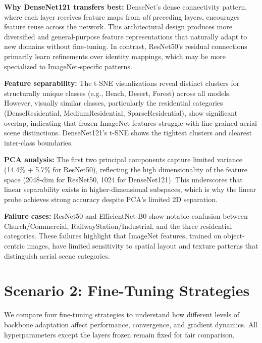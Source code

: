 \documentclass[11pt, a4paper]{article}
\begin{document}
\textbf{Why DenseNet121 transfers best:} DenseNet's dense connectivity pattern, where each layer receives feature maps from \emph{all} preceding layers, encourages feature reuse across the network. This architectural design produces more diversified and general-purpose feature representations that naturally adapt to new domains without fine-tuning. In contrast, ResNet50's residual connections primarily learn refinements over identity mappings, which may be more specialized to ImageNet-specific patterns.

\textbf{Feature separability:} The t-SNE visualizations reveal distinct clusters for structurally unique classes (e.g., Beach, Desert, Forest) across all models. However, visually similar classes, particularly the residential categories (DenseResidential, MediumResidential, SparseResidential), show significant overlap, indicating that frozen ImageNet features struggle with fine-grained aerial scene distinctions. DenseNet121's t-SNE shows the tightest clusters and clearest inter-class boundaries.

\textbf{PCA analysis:} The first two principal components capture limited variance (14.4\% + 5.7\% for ResNet50), reflecting the high dimensionality of the feature space (2048-dim for ResNet50, 1024 for DenseNet121). This underscores that linear separability exists in higher-dimensional subspaces, which is why the linear probe achieves strong accuracy despite PCA's limited 2D separation.

\textbf{Failure cases:} ResNet50 and EfficientNet-B0 show notable confusion between Church/Commercial, RailwayStation/Industrial, and the three residential categories. These failures highlight that ImageNet features, trained on object-centric images, have limited sensitivity to spatial layout and texture patterns that distinguish aerial scene categories.


\section{Scenario 2: Fine-Tuning Strategies}

We compare four fine-tuning strategies to understand how different levels of backbone adaptation affect performance, convergence, and gradient dynamics. All hyperparameters except the layers frozen remain fixed for fair comparison.
\end{document}
